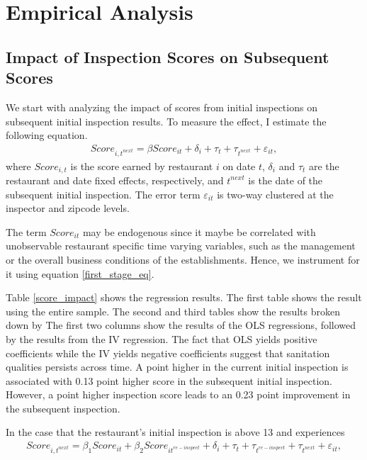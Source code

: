 \documentclass[11pt]{article}
\begin{document}
\section{Empirical Analysis}
\label{empirical_sec}

\subsection{Impact of Inspection Scores on Subsequent Scores}

We start with analyzing the impact of scores from initial inspections on subsequent initial inspection results. To measure the effect, I estimate the following equation. 
\begin{align}
        Score_{i,t^{next}} = \beta Score_{it} + \delta_i + \tau_{t} + \tau_{t^{next}} + \varepsilon_{it},
        \label{score}
\end{align}
where $Score_{i,t}$ is the score earned by restaurant $i$ on date $t$, $\delta_i$ and $\tau_t$ are the restaurant and date fixed effects, respectively, and $t^{next}$ is the date of the subsequent initial inspection. The error term $\varepsilon_{it}$ is two-way clustered at the inspector and zipcode levels. 

The term $Score_{it}$ may be endogenous since it maybe be correlated with unobservable restaurant specific time varying variables, such as the management or the overall business conditions of the establishments. Hence, we instrument for it using equation \eqref{first_stage_eq}.  

Table \ref{score_impact} shows the regression results. The first table shows the result using the entire sample. The second and third tables show the results broken down by The first two columns show the results of the OLS regressions, followed by the results from the IV regression. The fact that OLS yields positive coefficients while the IV yields negative coefficients suggest that sanitation qualities persists across time. A point higher in the current initial inspection is associated with 0.13 point higher score in the subsequent initial inspection. However, a point higher inspection score leads to an 0.23 point improvement in the subsequent inspection. 

In the case that the restaurant's initial inspection is above 13 and experiences 
\begin{align}
  Score_{i,t^{next}} = \beta_1 Score_{it} + \beta_2 Score_{it^{re-inspect}}+ \delta_i + \tau_{t} + \tau_{t^{re-inspect}}+ \tau_{t^{next}} + \varepsilon_{it},
  \label{score}
\end{align}
\end{document}
